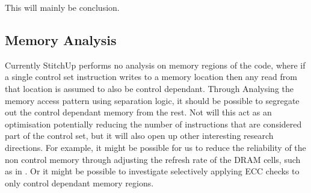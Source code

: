 This will mainly be conclusion.

\subsection{Memory Analysis}
Currently StitchUp performs no analysis on memory regions of the code,
where if a single control set instruction writes to a memory location
then any read from that location is assumed to also be control dependant.
Through Analysing the memory access pattern using separation logic, it should
be possible to segregate out the control dependant memory from the rest.
Not will this act as an optimisation potentially reducing the number of
instructions that are considered part of the control set, but it will also
open up other interesting research directions. For example, it might be possible
for us to reduce the reliability of the non control memory through adjusting
the refresh rate of the DRAM cells, such as in \cite{liu2012flikker}.
Or it might be possible to investigate selectively applying ECC checks to
only control dependant memory regions.
